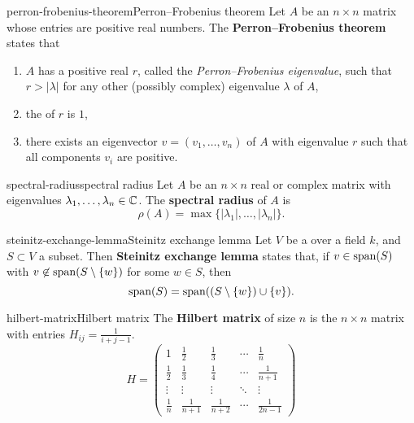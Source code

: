 \begin{topic}{perron-frobenius-theorem}{Perron--Frobenius theorem}
    Let $A$ be an $n \times n$ matrix whose entries are positive real numbers. The \textbf{Perron--Frobenius theorem} states that
    \begin{enumerate}[label=(\roman*)]
        \item $A$ has a positive real  $r$, called the \textit{Perron--Frobenius eigenvalue}, such that $r > |\lambda|$ for any other (possibly complex) eigenvalue $\lambda$ of $A$,
        \item the  of $r$ is $1$,
        \item there exists an eigenvector $v = (v_1, \ldots, v_n)$ of $A$ with eigenvalue $r$ such that all components $v_i$ are positive.
    \end{enumerate}
\end{topic}

\begin{topic}{spectral-radius}{spectral radius}
    Let $A$ be an $n \times n$ real or complex matrix with eigenvalues $\lambda_1, \ldots, \lambda_n \in \mathbb{C}$. The \textbf{spectral radius} of $A$ is 
    \[ \rho(A) = \max \{ |\lambda_1|, \ldots, |\lambda_n| \} . \]
\end{topic}

\begin{topic}{steinitz-exchange-lemma}{Steinitz exchange lemma}
    Let $V$ be a  over a field $k$, and $S \subset V$ a subset. Then \textbf{Steinitz exchange lemma} states that, if $v \in \textup{span}(S)$ with $v \not\in \textup{span}(S \setminus \{ w \})$ for some $w \in S$, then
    \[ \textup{span}(S) = \textup{span}((S \setminus \{ w \}) \cup \{ v \}) . \]
\end{topic}

\begin{topic}{hilbert-matrix}{Hilbert matrix}
    The \textbf{Hilbert matrix} of size $n$ is the $n \times n$ matrix with entries $H_{ij} = \frac{1}{i + j - 1}$.
    \[ H = \begin{pmatrix} 1 & \frac{1}{2} & \frac{1}{3} & \cdots & \frac{1}{n} \\ \frac{1}{2} & \frac{1}{3} & \frac{1}{4} & \cdots & \frac{1}{n + 1} \\ \vdots & \vdots & \vdots & \ddots & \vdots \\ \frac{1}{n} & \frac{1}{n + 1} & \frac{1}{n + 2} & \cdots & \frac{1}{2n - 1} \end{pmatrix} \]
\end{topic}

